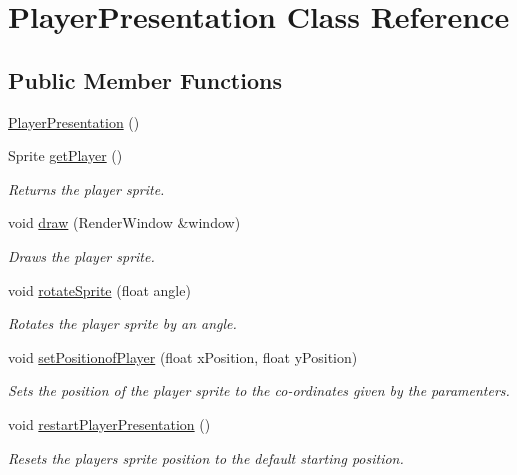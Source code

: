\hypertarget{class_player_presentation}{}\section{Player\+Presentation Class Reference}
\label{class_player_presentation}
\subsection*{Public Member Functions}
\begin{DoxyCompactItemize}
\item 
\hyperlink{class_player_presentation_ae5b2e1e54cb57697d020eb1afe45225f}{Player\+Presentation} ()
\item 
Sprite \hyperlink{class_player_presentation_a5ce015d2ac13d9e3eacf89b96da31ee2}{get\+Player} ()
\begin{DoxyCompactList}\small\item\em Returns the player sprite. \end{DoxyCompactList}\item 
void \hyperlink{class_player_presentation_a0ee08eeb4f0c8687450f60d635b4fe8a}{draw} (Render\+Window \&window)
\begin{DoxyCompactList}\small\item\em Draws the player sprite. \end{DoxyCompactList}\item 
void \hyperlink{class_player_presentation_af938e83bf3a90263076411e0935731bd}{rotate\+Sprite} (float angle)
\begin{DoxyCompactList}\small\item\em Rotates the player sprite by an angle. \end{DoxyCompactList}\item 
void \hyperlink{class_player_presentation_aef6ba74848a34fb93528062bda98059e}{set\+Positionof\+Player} (float x\+Position, float y\+Position)
\begin{DoxyCompactList}\small\item\em Sets the position of the player sprite to the co-\/ordinates given by the paramenters. \end{DoxyCompactList}\item 
\mbox{\label{class_player_presentation_ae4bf63751b63f582902d4ea31e06a486}} 
void \hyperlink{class_player_presentation_ae4bf63751b63f582902d4ea31e06a486}{restart\+Player\+Presentation} ()
\begin{DoxyCompactList}\small\item\em Resets the player\textquotesingle{}s sprite position to the default starting position. \end{DoxyCompactList}\end{DoxyCompactItemize}


